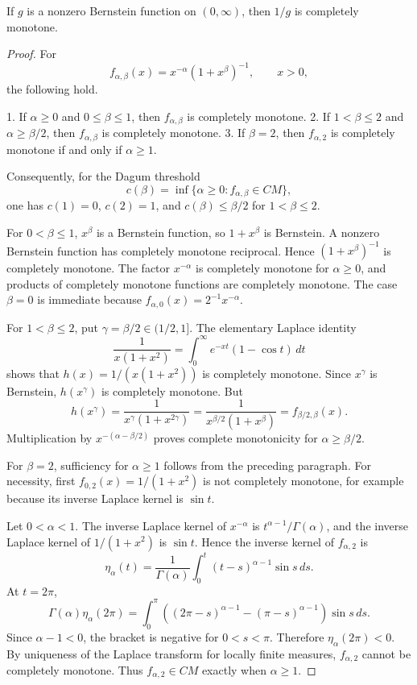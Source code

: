 \begin{proposition}
\label{res:bf-reciprocal-is-cm}
If \(g\) is a nonzero Bernstein function on \((0,\infty)\), then \(1/g\) is completely monotone.
\end{proposition}
\begin{proof}
For
\[
f_{\alpha,\beta}(x)=x^{-\alpha}(1+x^\beta)^{-1},\qquad x>0,
\]
the following hold.

1. If \(\alpha\ge0\) and \(0\le\beta\le1\), then \(f_{\alpha,\beta}\) is completely monotone.
2. If \(1<\beta\le2\) and \(\alpha\ge\beta/2\), then \(f_{\alpha,\beta}\) is completely monotone.
3. If \(\beta=2\), then \(f_{\alpha,2}\) is completely monotone if and only if \(\alpha\ge1\).

Consequently, for the Dagum threshold
\[
c(\beta)=\inf\{\alpha\ge0:f_{\alpha,\beta}\in CM\},
\]
one has \(c(1)=0\), \(c(2)=1\), and \(c(\beta)\le\beta/2\) for \(1<\beta\le2\).

For \(0<\beta\le1\), \(x^\beta\) is a Bernstein function, so \(1+x^\beta\) is Bernstein. A nonzero Bernstein function has completely monotone reciprocal. Hence \((1+x^\beta)^{-1}\) is completely monotone. The factor \(x^{-\alpha}\) is completely monotone for \(\alpha\ge0\), and products of completely monotone functions are completely monotone. The case \(\beta=0\) is immediate because \(f_{\alpha,0}(x)=2^{-1}x^{-\alpha}\).

For \(1<\beta\le2\), put \(\gamma=\beta/2\in(1/2,1]\). The elementary Laplace identity
\[
\frac1{x(1+x^2)}=\int_0^\infty e^{-xt}(1-\cos t)\,dt
\]
shows that \(h(x)=1/(x(1+x^2))\) is completely monotone. Since \(x^\gamma\) is Bernstein, \(h(x^\gamma)\) is completely monotone. But
\[
h(x^\gamma)=\frac1{x^\gamma(1+x^{2\gamma})}
=\frac1{x^{\beta/2}(1+x^\beta)}
=f_{\beta/2,\beta}(x).
\]
Multiplication by \(x^{-(\alpha-\beta/2)}\) proves complete monotonicity for \(\alpha\ge\beta/2\).

For \(\beta=2\), sufficiency for \(\alpha\ge1\) follows from the preceding paragraph. For necessity, first \(f_{0,2}(x)=1/(1+x^2)\) is not completely monotone, for example because its inverse Laplace kernel is \(\sin t\).

Let \(0<\alpha<1\). The inverse Laplace kernel of \(x^{-\alpha}\) is \(t^{\alpha-1}/\Gamma(\alpha)\), and the inverse Laplace kernel of \(1/(1+x^2)\) is \(\sin t\). Hence the inverse kernel of \(f_{\alpha,2}\) is
\[
\eta_\alpha(t)=\frac1{\Gamma(\alpha)}\int_0^t(t-s)^{\alpha-1}\sin s\,ds.
\]
At \(t=2\pi\),
\[
\Gamma(\alpha)\eta_\alpha(2\pi)
=\int_0^\pi\left((2\pi-s)^{\alpha-1}-(\pi-s)^{\alpha-1}\right)\sin s\,ds.
\]
Since \(\alpha-1<0\), the bracket is negative for \(0<s<\pi\). Therefore \(\eta_\alpha(2\pi)<0\). By uniqueness of the Laplace transform for locally finite measures, \(f_{\alpha,2}\) cannot be completely monotone. Thus \(f_{\alpha,2}\in CM\) exactly when \(\alpha\ge1\).
\end{proof}

